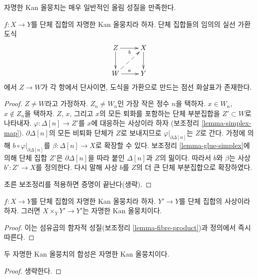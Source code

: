 \noindent
자명한 Kan 올뭉치는 매우 일반적인 올림 성질을 만족한다.

\begin{lemma}
\label{lemma-trivial-kan}
$f : X \to Y$를 단체 집합의 자명한 Kan 올뭉치라 하자. 단체 집합들의
임의의 실선 가환도식
$$
\xymatrix{
Z \ar[r]_b \ar[d] & X \ar[d] \\
W \ar[r]^a \ar@{-->}[ru] & Y
}
$$
에서 $Z \to W$가 각 항에서 단사이면, 도식을 가환으로 만드는 점선
화살표가 존재한다.
\end{lemma}

\begin{proof}
$Z \not = W$라고 가정하자. $Z_n \not = W_n$인 가장 작은 정수 $n$을
택하자. $x \in W_n$, $x \not \in Z_n$을 택하자. $Z$, $x$, 그리고
$x$의 모든 퇴화를 포함하는 단체 부분집합을 $Z' \subset W$로 나타내자.
$\varphi : \Delta[n] \to Z'$를 $x$에 대응하는 사상이라 하자
(보조정리 \ref{lemma-simplex-map}).
$\partial \Delta[n]$의 모든 비퇴화 단체가 $Z$로 보내지므로
$\varphi|_{\partial \Delta[n]}$는 $Z$로 간다. 가정에 의해
$b \circ \varphi|_{\partial \Delta[n]}$를
$\beta : \Delta[n] \to X$로 확장할 수 있다. 보조정리
\ref{lemma-glue-simplex}에 의해 단체 집합 $Z'$은
$\partial \Delta[n]$을 따라 붙인 $\Delta[n]$과 $Z$의 밂이다. 따라서
$b$와 $\beta$는 사상 $b' : Z' \to X$를 정의한다. 다시 말해 사상
$b$를 $Z$의 더 큰 단체 부분집합으로 확장하였다.

\medskip\noindent
초른 보조정리를 적용하면 증명이 끝난다(생략).
\end{proof}

\begin{lemma}
\label{lemma-trivial-kan-base-change}
$f : X \to Y$를 단체 집합의 자명한 Kan 올뭉치라 하자.
$Y' \to Y$를 단체 집합의 사상이라 하자. 그러면
$X \times_Y Y' \to Y'$는 자명한 Kan 올뭉치이다.
\end{lemma}

\begin{proof}
이는 섬유곱의 함자적 성질(보조정리 \ref{lemma-fibre-product})과 정의에서
즉시 따른다.
\end{proof}

\begin{lemma}
\label{lemma-trivial-kan-composition}
두 자명한 Kan 올뭉치의 합성은 자명한 Kan 올뭉치이다.
\end{lemma}

\begin{proof}
생략한다.
\end{proof}

